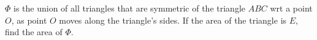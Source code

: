 $\Phi$ is the union of all triangles that are symmetric of the triangle $ABC$ wrt a point $O$, as point $O$ moves along the triangle's sides. If the  area of the triangle is $E$, find the area of $\Phi$.